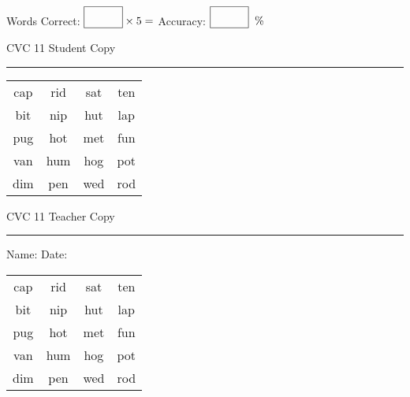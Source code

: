 \documentclass{memoir}
\begin{document}
\small

Words Correct: $\fbox{\phantom{\huge 100}} \times 5 = $ Accuracy: $\fbox{\phantom{\huge 100}}\;\; \%$ 

\vfill

\newpage


\footnotesize \noindent
CVC 11 \hfill Student Copy
\smallskip
\hrule

\Large

\setlength{\tabcolsep}{14pt}
\def\arraystretch{2}

{\selectfont


\begin{vplace}[0.5]
\begin{center}
\begin{tabular}{cccc}
cap & rid & sat & ten \\
bit & nip & hut & lap \\
pug & hot & met & fun \\
van & hum & hog & pot \\
dim & pen & wed & rod \\
\end{tabular}
\end{center}
\end{vplace}

}

\newpage

\footnotesize \noindent
CVC 11 \hfill Teacher Copy
\smallskip
\hrule

\small

\vfill

\noindent
Name: \underline{\hspace{1.75in}} \hfill Date: \underline{\hspace{1in}}

\Large

{\selectfont


\begin{vplace}[0.5]
\begin{center}
\begin{tabular}{cccc}
cap & rid & sat & ten \\
bit & nip & hut & lap \\
pug & hot & met & fun \\
van & hum & hog & pot \\
dim & pen & wed & rod \\
\end{tabular}
\end{center}
\end{vplace}



}
\end{document}
